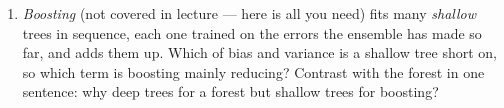 \documentclass[
  11pt,
]{article}
\providecommand{\tightlist}{%
  \setlength{\itemsep}{0pt}\setlength{\parskip}{0pt}}
\newcommand{\answerspace}[1]{\par\vspace*{#1}}  %
\begin{document}
\answerspace{2.2in}

\begin{enumerate}
\def\labelenumi{(\alph{enumi})}
\setcounter{enumi}{3}
\tightlist
\item
  \emph{Boosting} (not covered in lecture --- here is all you need) fits
  many \emph{shallow} trees in sequence, each one trained on the errors
  the ensemble has made so far, and adds them up. Which of bias and
  variance is a shallow tree short on, so which term is boosting mainly
  reducing? Contrast with the forest in one sentence: why deep trees for
  a forest but shallow trees for boosting?
\end{enumerate}

\answerspace{1.8in}

\begin{solutionbox}


\end{solutionbox}
\end{document}
